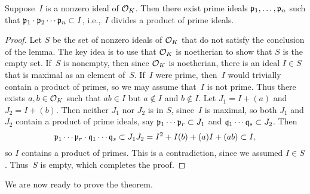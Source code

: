 \begin{lemma}\label{lem:divprod}
Suppose~$I$ is a nonzero ideal of $\mathcal{O}_K$.  Then there exist prime ideals
$\mathfrak{p}_1,\ldots, \mathfrak{p}_n$ such that $\mathfrak{p}_1\cdot \mathfrak{p}_2\cdots \mathfrak{p}_n \subset{}I$,
i.e.,~$I$ divides a product of prime ideals.
\end{lemma}
\begin{proof}
Let $S$ be the set of nonzero ideals of $\mathcal{O}_K$ that do not
satisfy the conclusion
of the lemma.  The key idea is to use that $\mathcal{O}_K$ is noetherian to show that
$S$ is the empty set.   If~$S$ is
nonempty, then since $\mathcal{O}_K$ is noetherian, there is an ideal
$I\in S$ that is maximal as an element of~$S$.  If~$I$ were prime, then~$I$
would trivially contain a product of primes, so we may assume that~$I$
is not prime.  Thus there exists $a,b\in \mathcal{O}_K$ such that $ab\in
I$ but $a\not\in I$ and $b\not\in I$.  Let $J_1 = I+(a)$ and
$J_2=I+(b)$.  Then neither $J_1$ nor $J_2$ is in $S$, since~$I$ is
maximal, so both $J_1$ and $J_2$ contain a product of prime ideals,
say $\mathfrak{p}_1 \cdots \mathfrak{p}_r \subset J_1$ and $\mathfrak{q}_1\cdots \mathfrak{q}_s \subset J_2$.
Then
$$
\mathfrak{p}_1  \cdots \mathfrak{p}_r \cdot \mathfrak{q}_1\cdots \mathfrak{q}_s \subset
J_1 J_2 = I^2 + I(b)+  (a)I+ (ab) \subset I,$$
so $I$ contains a product of primes.  This is a contradiction,
since we assumed $I\in S$.   Thus~$S$ is empty, which completes
the proof.
\end{proof}
We are now ready to prove the theorem.

